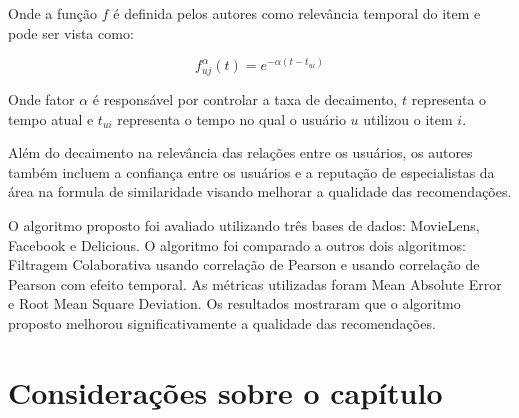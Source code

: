 Onde a função $f$ é definida pelos autores como relevância temporal do item e pode ser vista como:

\begin{equation}
  f_{uj}^\alpha(t) = e^{- \alpha (t - t_{ui})}
  \label{eq:wei-relevancia-temporal}
\end{equation}

Onde fator $\alpha$ é responsável por controlar a taxa de decaimento, $t$ representa o tempo atual e $t_{ui}$ representa
o tempo no qual o usuário $u$ utilizou o item $i$.

Além do decaimento na relevância das relações entre os usuários, os autores também incluem a confiança entre os
usuários e a reputação de especialistas da área na formula de similaridade visando melhorar a qualidade das
recomendações.

O algoritmo proposto foi avaliado utilizando três bases de dados: MovieLens, Facebook e Delicious. O algoritmo foi
comparado a outros dois algoritmos: Filtragem Colaborativa usando correlação de Pearson e usando correlação de Pearson
com efeito temporal. As métricas utilizadas foram Mean Absolute Error e Root Mean Square Deviation. Os resultados
mostraram que o algoritmo proposto melhorou significativamente a qualidade das recomendações.

\section{Considerações sobre o capítulo}
